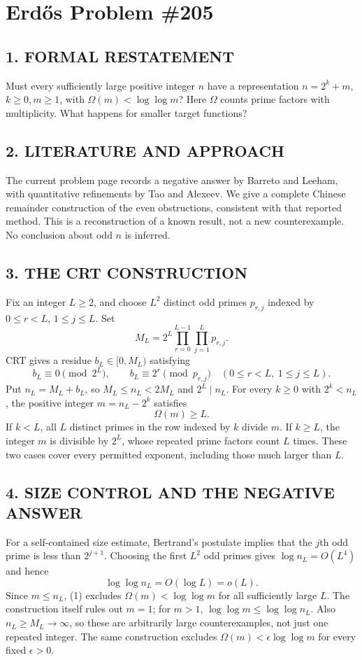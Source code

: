\section{Erd\H{o}s Problem \#205}
\subsection*{1. FORMAL RESTATEMENT}
Must every sufficiently large positive integer $n$ have a representation $n=2^k+m$, $k\ge0,m\ge1$, with $\Omega(m)<\log\log m$? Here $\Omega$ counts prime factors with multiplicity. What happens for smaller target functions?
\subsection*{2. LITERATURE AND APPROACH}
The current problem page records a negative answer by Barreto and Leeham, with quantitative refinements by Tao and Alexeev. We give a complete Chinese remainder construction of the even obstructions, consistent with that reported method. This is a reconstruction of a known result, not a new counterexample. No conclusion about odd $n$ is inferred.
\subsection*{3. THE CRT CONSTRUCTION}
Fix an integer $L\ge2$, and choose $L^2$ distinct odd primes $p_{r,j}$ indexed by $0\le r<L$, $1\le j\le L$. Set
\[
 M_L=2^L\prod_{r=0}^{L-1}\prod_{j=1}^L p_{r,j}.
\]
CRT gives a residue $b_L\in[0,M_L)$ satisfying
\[
 b_L\equiv0\pmod{2^L},\qquad b_L\equiv2^r\pmod{p_{r,j}}
 \quad(0\le r<L,\ 1\le j\le L).
\]
Put $n_L=M_L+b_L$, so $M_L\le n_L<2M_L$ and $2^L\mid n_L$.
For every $k\ge0$ with $2^k<n_L$, the positive integer $m=n_L-2^k$ satisfies
\[
 \Omega(m)\ge L.                                         \tag{1}
\]
If $k<L$, all $L$ distinct primes in the row indexed by $k$ divide $m$. If $k\ge L$, the integer $m$ is divisible by $2^L$, whose repeated prime factors count $L$ times. These two cases cover every permitted exponent, including those much larger than $L$.
\subsection*{4. SIZE CONTROL AND THE NEGATIVE ANSWER}
For a self-contained size estimate, Bertrand's postulate implies that the $j$th odd prime is less than $2^{j+1}$. Choosing the first $L^2$ odd primes gives $\log n_L=O(L^4)$ and hence
\[
 \log\log n_L=O(\log L)=o(L).
\]
Since $m\le n_L$, (1) excludes $\Omega(m)<\log\log m$ for all sufficiently large $L$. The construction itself rules out $m=1$; for $m>1$, $\log\log m\le\log\log n_L$. Also $n_L\ge M_L\to\infty$, so these are arbitrarily large counterexamples, not just one repeated integer. The same construction excludes $\Omega(m)<\epsilon\log\log m$ for every fixed $\epsilon>0$.

